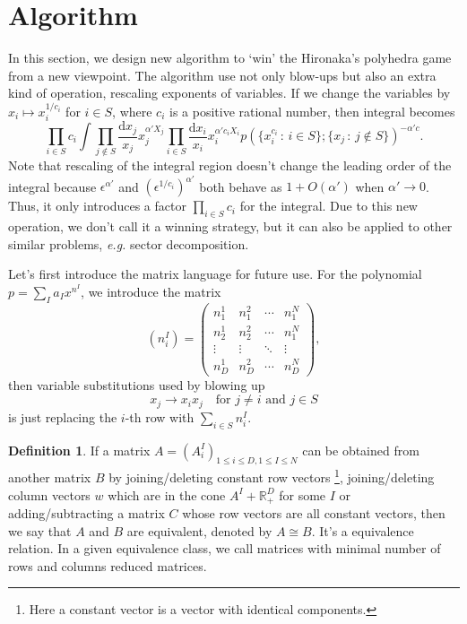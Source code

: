 \documentclass[12pt]{article}
\theoremstyle{definition}
\newtheorem{defi}[para]{Definition}
\theoremstyle{plain}
\newcommand{\dif}{\mathrm{d}} %
\begin{document}
\section{Algorithm}\label{s:alg}

In this section, we design new algorithm to `win' the Hironaka's
polyhedra game from a new viewpoint. The algorithm use not only blow-ups
but also an extra kind of operation, rescaling exponents of variables. 
If we change the variables by
\(
	x_i\mapsto x_i^{1/c_i}
\)
for $i\in S$, where $c_i$ is a positive rational number, then integral becomes
\[
	\prod_{i\in S}c_i\int
	\prod_{j\not\in S}\frac{\dif x_j}{x_j}x_j^{\alpha' X_j}
	\prod_{i\in S}\frac{\dif x_i}{x_i}x_i^{\alpha' c_iX_i}
	p(\{x_i^{c_i}\,:\, i\in S\};\{x_j\,:\, j\not\in S\})^{-\alpha' c}.
\]
Note that rescaling of the integral region doesn't change the leading order of the integral
because $\epsilon^{\alpha'}$ and $(\epsilon^{1/c_i})^{\alpha'}$ both behave as $1+O(\alpha')$
when $\alpha'\to 0$. Thus, it only introduces a factor $\prod_{i\in S}c_i$ 
for the integral. %
Due to this new operation, we don't call it a winning strategy, but it can also be applied to other
similar problems, \textit{e.g.} sector decomposition.

Let's first introduce the matrix language for future use.
For the polynomial $p=\sum_I a_I x^{n^I}$, we introduce the matrix 
\[
	(n_{i}^{I})=
\begin{pmatrix}
	n_1^1 & n_1^2 & \cdots & n_1^N\\
	n_2^1 & n_2^2 & \cdots & n_1^N\\
	\vdots & \vdots & \ddots & \vdots\\
	n_D^1 & n_D^2 & \cdots & n_D^N
\end{pmatrix},
\]
then variable substitutions used by blowing up
\[
	x_j\to x_ix_j \quad \text{for $j\neq i$ and $j\in S$}
\] 
is just replacing the $i$-th row with $\sum_{i\in S} n_i^I$.

\begin{defi}
If a matrix $A=(A^I_i)_{1\leq i\leq D,1\leq I\leq N}$ 
can be obtained from another matrix $B$ by joining/deleting constant row vectors%
\footnote{Here a constant vector is a vector with identical components.},
joining/deleting column vectors $w$ which are in the cone $A^I+\mathbb R_+^D$ for 
some $I$ or adding/subtracting a matrix $C$ whose row vectors are all constant vectors,
then we say that $A$ and $B$ are equivalent, denoted by $A\cong B$.
It's a equivalence relation.
In a given equivalence class, we call matrices with minimal number of rows and columns 
reduced matrices.
\end{defi}
\end{document}
